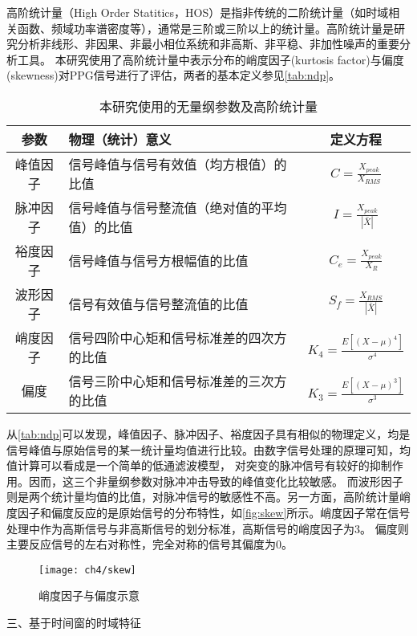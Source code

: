 高阶统计量（High Order Statitics，HOS）是指非传统的二阶统计量（如时域相关函数、频域功率谱密度等），通常是三阶或三阶以上的统计量\cite{Zhang2002,Tu2013}。高阶统计量是研究分析非线形、非因果、非最小相位系统和非高斯、非平稳、非加性噪声的重要分析工具。
本研究使用了高阶统计量中表示分布的峭度因子(kurtosis factor)与偏度(skewness)对PPG信号进行了评估，两者的基本定义参见\autoref{tab:ndp}。
\begin{table}[htbp]
    \centering
    \caption{\label{tab:ndp}本研究使用的无量纲参数及高阶统计量}
    \begin{tabularx}{\linewidth}{cX<{\centering}c}
        \toprule
        \textbf{参数}&\textbf{物理（统计）意义}&\textbf{定义方程}\\
        \midrule
        峰值因子&信号峰值与信号有效值（均方根值）的比值& $C=\frac{X_{peak}}{X_{RMS}}$      \\
        脉冲因子&信号峰值与信号整流值（绝对值的平均值）的比值&$I=\frac{X_{peak}}{|\bar{X}|}$      \\
        裕度因子&信号峰值与信号方根幅值的比值&$C_e=\frac{X_{peak}}{X_R}$       \\
        波形因子&信号有效值与信号整流值的比值&$S_f=\frac{X_{RMS}}{|\bar{X}|}$      \\
        峭度因子&信号四阶中心矩和信号标准差的四次方的比值&$K_4=\frac{E[(X-\mu)^4]}{\sigma^4}$      \\
        偏度&信号三阶中心矩和信号标准差的三次方的比值&$K_3=\frac{E[(X-\mu)^3]}{\sigma^3}$      \\
        \bottomrule
    \end{tabularx}
\end{table}

从\autoref{tab:ndp}可以发现，峰值因子、脉冲因子、裕度因子具有相似的物理定义，均是信号峰值与原始信号的某一统计量均值进行比较。由数字信号处理的原理可知，均值计算可以看成是一个简单的低通滤波模型，
对突变的脉冲信号有较好的抑制作用。因而，这三个非量纲参数对脉冲冲击导致的峰值变化比较敏感。
而波形因子则是两个统计量均值的比值，对脉冲信号的敏感性不高。另一方面，高阶统计量峭度因子和偏度反应的是原始信号的分布特性，如\autoref{fig:skew}所示。峭度因子常在信号处理中作为高斯信号与非高斯信号的划分标准，高斯信号的峭度因子为3。
偏度则主要反应信号的左右对称性，完全对称的信号其偏度为0。
\begin{figure}[htbp]
    \centering
    \texttt{[image: ch4/skew]}
    \caption{\label{fig:skew}峭度因子与偏度示意}
\end{figure}

三、基于时间窗的时域特征

